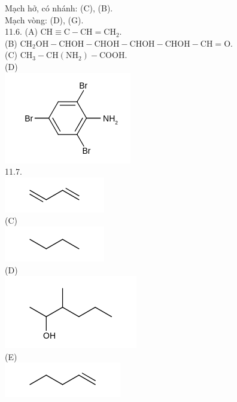 \documentclass[10pt]{article}
\begin{document}
Mạch hở, có nhánh: (C), (B).\\
Mạch vòng: (D), (G).\\
11.6. (A) $\mathrm{CH} \equiv \mathrm{C}-\mathrm{CH}=\mathrm{CH}_{2}$.\\
(B) $\mathrm{CH}_{2} \mathrm{OH}-\mathrm{CHOH}-\mathrm{CHOH}-\mathrm{CHOH}-\mathrm{CHOH}-\mathrm{CH}=\mathrm{O}$.\\
(C) $\mathrm{CH}_{3}-\mathrm{CH}\left(\mathrm{NH}_{2}\right)-\mathrm{COOH}$.\\
(D)\\
\includegraphics{smile-f3b1234615d12f663786c365593897ff9d753c99}\\
11.7.\\
\includegraphics{smile-fdbdfc37788b86bf80b92f403c7bdc96158cf576}\\
(C)\\
\includegraphics{smile-52329a4ab613d07648b2a21cb02106034622a52a}\\
(D)\\
\includegraphics{smile-f9c254597879354a187d4de95414d11aa0118f37}\\
(E)\\
\includegraphics{smile-9d627bcfff33cccb48fd6d316a6416a1199c8658}\\
\end{document}
